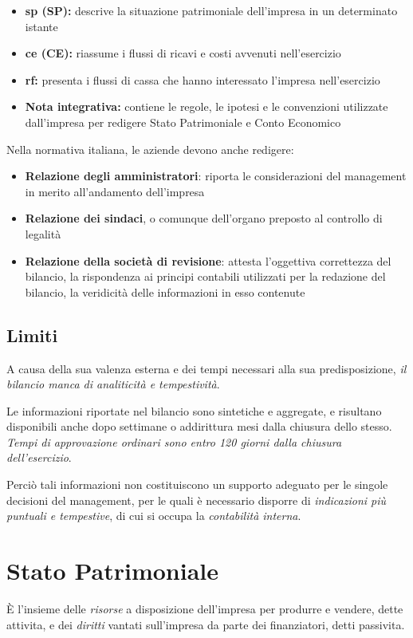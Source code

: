\documentclass[10pt,a4paper,fleqn,oneside]{book}
\begin{document}
\begin{itemize}
    \item \textbf{\Gls{sp} (SP):} descrive la situazione patrimoniale dell’impresa in un determinato istante
    \item \textbf{\Gls{ce} (CE):} riassume i flussi di ricavi e costi avvenuti nell’esercizio
    \item \textbf{\Gls{rf}:} presenta i flussi di cassa che hanno interessato l’impresa nell’esercizio
    \item \textbf{Nota integrativa:} contiene le regole, le ipotesi e le convenzioni utilizzate dall’impresa per redigere Stato Patrimoniale e Conto Economico
\end{itemize}

Nella normativa italiana, le aziende devono anche redigere:
\begin{itemize}
    \item \textbf{Relazione degli amministratori}: riporta le considerazioni del management in merito all’andamento dell’impresa
    \item \textbf{Relazione dei sindaci}, o comunque dell’organo preposto al controllo di legalità
    \item \textbf{Relazione della società di revisione}: attesta l’oggettiva correttezza del bilancio, la rispondenza ai principi contabili utilizzati per la redazione del bilancio, la veridicità delle informazioni in esso contenute
\end{itemize}

\subsection{Limiti}
A causa della sua valenza esterna e dei tempi necessari alla sua  predisposizione,
\emph{il bilancio manca di analiticità e tempestività}.

Le informazioni riportate nel bilancio sono sintetiche e aggregate, e risultano
disponibili anche dopo settimane o  addirittura mesi dalla chiusura dello stesso.
\emph{Tempi di approvazione ordinari sono entro 120 giorni dalla chiusura dell’esercizio}.

Perciò tali informazioni non costituiscono un supporto adeguato per le singole decisioni del management,
per le quali è necessario disporre di \emph{indicazioni più puntuali e tempestive}, di cui si occupa la
\emph{contabilità interna}.

\section{Stato Patrimoniale}
È l'insieme delle \emph{risorse} a disposizione dell’impresa per produrre e vendere, dette \gls{attivita},
e dei \emph{diritti} vantati sull’impresa da parte dei finanziatori, detti \gls{passivita}.
\end{document}
